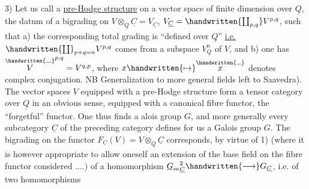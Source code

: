 3) Let us call a \uline{pre-Hodge structure} on a vector space  of finite dimension over $\underline{Q}$, the datum of a bigrading on $V\otimes_{\underline{Q}}\underline{C}=V_{\underline{C}}$, $V_{\underline{C}}=\handwritten{\coprod_{p,q}}V^{p,q}$, such that a) the corresponding total grading is ``defined over $\underline{Q}$'' \uline{i.e.} $\handwritten{\coprod}_{p+q=n}V^{p,q}$ comes from a subspace $V_{\underline{Q}}^n$ of $V$, and b) one has $\overset{\handwritten{\rule{.65em}{.35pt}}}{V}^{p,q}=V^{q,p}$, where $x\handwritten{\mapsto}\overset{\handwritten{\rule{.55em}{.35pt}}}{x}$ denotes complex conjugation. \unsure{(}NB Generalization to more general fields left to Saavedra). The vector spaces $V$ equipped with a pre-Hodge structure form a tensor category over $\underline{Q}$ in an obvious sense, equipped with a canonical fibre functor, the ``forgetful'' functor. One thus finds a alois group $G$, and  more generally every subcategory $\underline{C}$ of the preceding category defines for us a Galois group $G$. The bigrading on the  functor $F_{\underline{C}}(V)=V\otimes_{\underline{Q}}\underline{C}$ corresponds, by virtue of 1) (where it is however appropriate to allow oneself an extension of the base field on the fibre functor considered ....) of a homomorphism ${\underline{G}_m}_{\underline{C}}^2\handwritten{\longrightarrow}G_{\underline{C}}$, i.e. of two homomorphisms 
